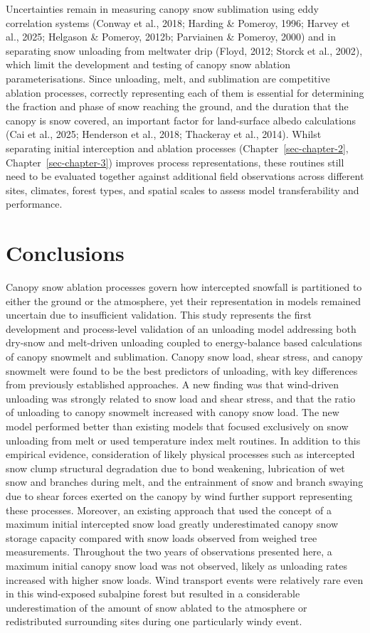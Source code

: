 \documentclass[
  letterpaper,
]{tex/uofsthesis-cs}
\begin{document}
Uncertainties remain in measuring canopy snow sublimation using eddy
correlation systems (Conway et al., 2018; Harding \& Pomeroy, 1996;
Harvey et al., 2025; Helgason \& Pomeroy, 2012b; Parviainen \& Pomeroy,
2000) and in separating snow unloading from meltwater drip (Floyd, 2012;
Storck et al., 2002), which limit the development and testing of canopy
snow ablation parameterisations. Since unloading, melt, and sublimation
are competitive ablation processes, correctly representing each of them
is essential for determining the fraction and phase of snow reaching the
ground, and the duration that the canopy is snow covered, an important
factor for land-surface albedo calculations (Cai et al., 2025; Henderson
et al., 2018; Thackeray et al., 2014). Whilst separating initial
interception and ablation processes (Chapter~\ref{sec-chapter-2},
Chapter~\ref{sec-chapter-3}) improves process representations, these
routines still need to be evaluated together against additional field
observations across different sites, climates, forest types, and spatial
scales to assess model transferability and performance.

\section{Conclusions}\label{conclusions-2}

Canopy snow ablation processes govern how intercepted snowfall is
partitioned to either the ground or the atmosphere, yet their
representation in models remained uncertain due to insufficient
validation. This study represents the first development and
process-level validation of an unloading model addressing both dry-snow
and melt-driven unloading coupled to energy-balance based calculations
of canopy snowmelt and sublimation. Canopy snow load, shear stress, and
canopy snowmelt were found to be the best predictors of unloading, with
key differences from previously established approaches. A new finding
was that wind-driven unloading was strongly related to snow load and
shear stress, and that the ratio of unloading to canopy snowmelt
increased with canopy snow load. The new model performed better than
existing models that focused exclusively on snow unloading from melt or
used temperature index melt routines. In addition to this empirical
evidence, consideration of likely physical processes such as intercepted
snow clump structural degradation due to bond weakening, lubrication of
wet snow and branches during melt, and the entrainment of snow and
branch swaying due to shear forces exerted on the canopy by wind further
support representing these processes. Moreover, an existing approach
that used the concept of a maximum initial intercepted snow load greatly
underestimated canopy snow storage capacity compared with snow loads
observed from weighed tree measurements. Throughout the two years of
observations presented here, a maximum initial canopy snow load was not
observed, likely as unloading rates increased with higher snow loads.
Wind transport events were relatively rare even in this wind-exposed
subalpine forest but resulted in a considerable underestimation of the
amount of snow ablated to the atmosphere or redistributed surrounding
sites during one particularly windy event.
\end{document}

